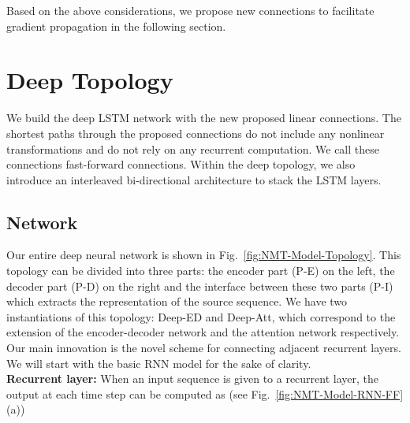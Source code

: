 \documentclass[11pt,letterpaper]{article}
\begin{document}
Based on the above considerations, we propose new connections to facilitate gradient propagation in the following section.



\section{Deep Topology}

We build the deep LSTM network with the new proposed linear connections. The shortest paths through the proposed connections do not include
any nonlinear transformations and do not rely on any recurrent computation. We call these connections fast-forward connections.  Within the
deep topology, we also introduce an interleaved bi-directional architecture to stack the LSTM layers.


\subsection{Network}

Our entire deep neural network is shown in Fig.~\ref{fig:NMT-Model-Topology}. This topology can be divided into three parts:
the encoder part (P-E) on the left, the decoder part (P-D) on the right and the interface between these two parts (P-I)
which extracts the representation of the source sequence. We have two instantiations of this topology: Deep-ED and Deep-Att, which  correspond
to the extension of the encoder-decoder network and the attention network respectively. Our main innovation is the novel
scheme for connecting adjacent recurrent layers. We will start with the basic RNN model for the sake of clarity.
\\
\noindent\textbf{Recurrent layer:} When an input sequence  is given to a recurrent layer, the output  at each time
step  can be computed as (see Fig.~\ref{fig:NMT-Model-RNN-FF} (a))
\end{document}

